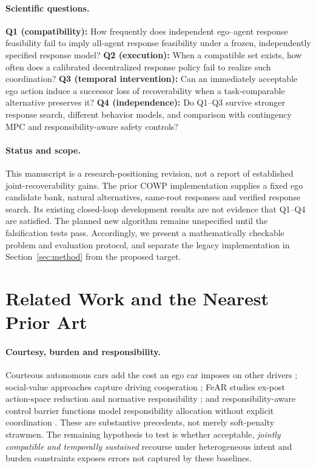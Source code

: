 \documentclass[10pt]{article}
\begin{document}
\paragraph{Scientific questions.}
\textbf{Q1 (compatibility):} How frequently does independent ego--agent response feasibility fail to imply all-agent response feasibility under a frozen, independently specified response model? \textbf{Q2 (execution):} When a compatible set exists, how often does a calibrated decentralized response policy fail to realize such coordination? \textbf{Q3 (temporal intervention):} Can an immediately acceptable ego action induce a successor loss of recoverability when a task-comparable alternative preserves it? \textbf{Q4 (independence):} Do Q1--Q3 survive stronger response search, different behavior models, and comparison with contingency MPC and responsibility-aware safety controls?

\paragraph{Status and scope.}
This manuscript is a research-positioning revision, not a report of established joint-recoverability gains. The prior COWP implementation supplies a fixed ego candidate bank, natural alternatives, same-root responses and verified response search. Its existing closed-loop development results are not evidence that Q1--Q4 are satisfied. The planned new algorithm remains unspecified until the falsification tests pass. Accordingly, we present a mathematically checkable problem and evaluation protocol, and separate the legacy implementation in Section~\ref{sec:method} from the proposed target.

\section{Related Work and the Nearest Prior Art}
\label{sec:related}
\paragraph{Courtesy, burden and responsibility.}
Courteous autonomous cars add the cost an ego car imposes on other drivers \parencite{sun2018courteous}; social-value approaches capture driving cooperation \parencite{schwarting2019social}; FeAR studies ex-post action-space reduction and normative responsibility \parencite{george2023feasible}; and responsibility-aware control barrier functions model responsibility allocation without explicit coordination \parencite{cosner2023responsibility}. These are substantive precedents, not merely soft-penalty strawmen. The remaining hypothesis to test is whether acceptable, \emph{jointly compatible and temporally sustained} recourse under heterogeneous intent and burden constraints exposes errors not captured by these baselines.
\end{document}
